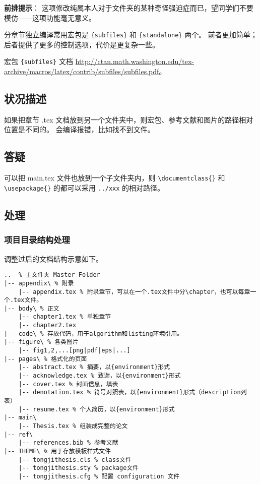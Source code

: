 \documentclass[../Main/thesis.tex]{subfiles}
\begin{document}
\textbf{前排提示}：
这项修改纯属本人对于文件夹的某种奇怪强迫症而已，望同学们不要模仿------这项功能毫无意义。

分章节独立编译常用宏包是 \texttt{\{subfiles\}} 和
\texttt{\{standalone\}} 两个。
前者更加简单；后者提供了更多的控制选项，代价是更复杂一些。

宏包 \texttt{\{subfiles\}} 文档
\url{http://ctan.math.washington.edu/tex-archive/macros/latex/contrib/subfiles/subfiles.pdf}。

\subsection{状况描述}

如果把章节 .tex
文档放到另一个文件夹中，则宏包、参考文献和图片的路径相对位置是不同的。
会编译报错，比如找不到文件。

\subsection{答疑}

可以把 main.tex 文件也放到一个子文件夹内，则
\texttt{\textbackslash{}documentclass\{\}} 和
\texttt{\textbackslash{}usepackage\{\}} 的都可以采用 \texttt{../xxx}
的相对路径。

\subsection{处理}

\subsubsection{项目目录结构处理}

调整过后的文档结构示意如下。

\begin{verbatim}
..  % 主文件夹 Master Folder
|-- appendix\ % 附录
    |-- appendix.tex % 附录章节，可以在一个.tex文件中分\chapter，也可以每章一个.tex文件。
|-- body\ % 正文
    |-- chapter1.tex % 单独章节
    |-- chapter2.tex
|-- code\ % 存放代码，用于algorithm和listing环境引用。
|-- figure\ % 各类图片
    |-- fig1,2,...[png|pdf|eps|...]
|-- pages\ % 格式化的页面
    |-- abstract.tex % 摘要，以{environment}形式
    |-- acknowledge.tex % 致谢，以{environment}形式
    |-- cover.tex % 封面信息，填表
    |-- denotation.tex % 符号对照表，以{environment}形式（description列表）
    |-- resume.tex % 个人简历，以{environment}形式
|-- main\
    |-- Thesis.tex % 组装成完整的论文
|-- ref\
    |-- references.bib % 参考文献
|-- THEME\ % 用于存放模板样式文件
    |-- tongjithesis.cls % class文件
    |-- tongjithesis.sty % package文件
    |-- tongjithesis.cfg % 配置 configuration 文件
\end{verbatim}
\end{document}
